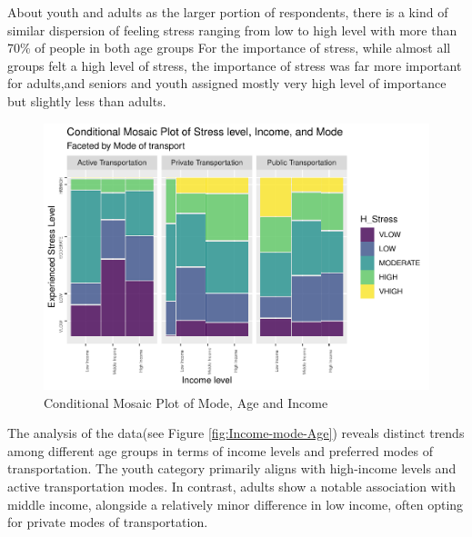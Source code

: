 \documentclass[
11pt, %
oneside, %
english, %
singlespacing, %
]{macthesis} %
\begin{document}
About youth and adults as the larger portion of respondents, there is a kind of similar dispersion of feeling stress ranging from low to high level with more than 70\% of people in both age groups For the importance of stress, while almost all groups felt a high level of stress, the importance of stress was far more important for adults,and seniors and youth assigned mostly very high level of importance but slightly less than adults.
\begin{figure}
\includegraphics[width=0.85\linewidth]{thesis_files/figure-latex/unnamed-chunk-30-1} \caption{\label{fig:Income-mode-Age}Conditional Mosaic Plot of Mode,  Age and Income}\label{fig:unnamed-chunk-30}
\end{figure}
The analysis of the data(see Figure \ref{fig:Income-mode-Age}) reveals distinct trends among different age groups in terms of income levels and preferred modes of transportation. The youth category primarily aligns with high-income levels and active transportation modes. In contrast, adults show a notable association with middle income, alongside a relatively minor difference in low income, often opting for private modes of transportation.
\end{document}
